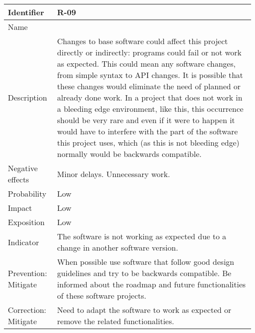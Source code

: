 \begin{table}[H]
	\begin{tabularx}{\textwidth}{|y|z|}
		\hline
		Identifier & \textbf{R-09} \\ \hline
		Name & \Rnueve \\ \hline
		Description &
			Changes to base software could affect this project directly or indirectly: programs could fail or not work as expected. \linej
			This could mean any software changes, from simple syntax to API changes. \linej
			It is possible that these changes would eliminate the need of planned or already done work. \linej
			In a project that does not work in a bleeding edge environment, like this, this occurrence should be very rare and even if it were to happen it would have to interfere with the part of the software this project uses, which (as this is not bleeding edge) normally would be backwards compatible.
		\\ \hline
		Negative effects &
			Minor delays. \linej
			Unnecessary work.
		\\ \hline
		Probability & Low\\ \hline
		Impact & Low \\ \hline
		Exposition &  Low\\ \hline
		Indicator & The software is not working as expected due to a change in another software version.\\ \hline
		Prevention: Mitigate &
			When possible use software that follow good design guidelines and try to be backwards compatible. \linej
			Be informed about the roadmap and future functionalities of these software projects.
		\\ \hline
		Correction: Mitigate &
			Need to adapt the software to work as expected or remove the related functionalities.
		\\ \hline
	\end{tabularx}
\end{table}

